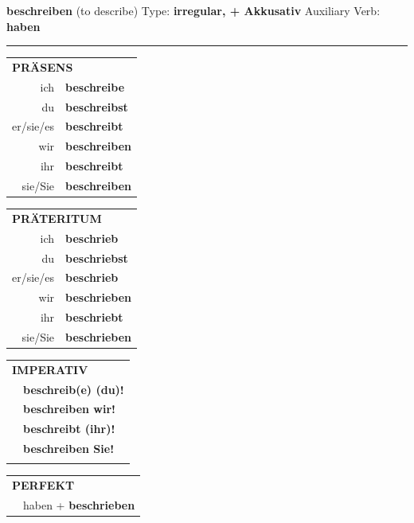 \documentclass[10pt,a4paper]{revtex4-2}
\begin{document}
\begin{verbbox-acc}
    {\Large \bf beschreiben} (to describe) \hfill Type: \textbf{irregular, + Akkusativ} \hfill Auxiliary Verb: \textbf{haben} 
    
     \vspace{5pt}

    \hrule
    
    \vspace{5pt}

  \begin{tabular}{rl}
     \multicolumn{2}{l}{\textbf{PRÄSENS} }\\
    ich & \textbf{beschreibe}\\
    du & \textbf{beschreibst}\\
    er/sie/es & \textbf{beschreibt}\\
    wir & \textbf{beschreiben}\\
    ihr & \textbf{beschreibt}\\
    sie/Sie & \textbf{beschreiben}\\
  \end{tabular}
  \hfill
     \begin{tabular}{rl}
    \multicolumn{2}{l}{\textbf{PRÄTERITUM} }\\
    ich & \textbf{beschrieb}\\
    du & \textbf{beschriebst}\\
    er/sie/es & \textbf{beschrieb}\\
    wir & \textbf{beschrieben}\\
    ihr & \textbf{beschriebt}\\
    sie/Sie & \textbf{beschrieben}\\
  \end{tabular}
  \hfill
  \begin{tabular}{rl}
     \multicolumn{2}{l}{\textbf{IMPERATIV} }\\
   & \textbf{beschreib(e) (du)!}\\
   & \textbf{beschreiben wir!}\\
   & \textbf{beschreibt (ihr)!}\\
   & \textbf{beschreiben Sie!}\\
   & \vspace{10pt}
  \end{tabular}

    \vspace{10pt}

 \begin{tabular}{rl}
     \multicolumn{2}{l}{\textbf{PERFEKT}}\\
   & haben + \textbf{beschrieben}\\
  \end{tabular}
\hfill
   \begin{tabular}{rl}
   

\end{tabular}
\end{verbbox-acc}
\end{document}

